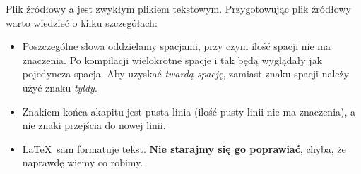 Plik źródłowy \LateX a jest zwykłym plikiem tekstowym. Przygotowując plik %
źródłowy warto wiedzieć o kilku szczegółach:

\begin{itemize}
\item
Poszczególne słowa oddzielamy spacjami, przy czym ilość spacji nie ma znaczenia.
Po kompilacji wielokrotne spacje i tak będą wyglądały jak pojedyncza spacja.
Aby uzyskać {\em twardą spację}, zamiast znaku spacji należy użyć znaku {\em
tyldy}.

\item
Znakiem końca akapitu jest pusta linia (ilość pusty linii nie ma znaczenia), a
nie znaki przejścia do nowej linii.

\item
\LaTeX~sam formatuje tekst. \textbf{Nie starajmy się go poprawiać}, chyba, że
naprawdę wiemy co robimy.
\end{itemize} 


